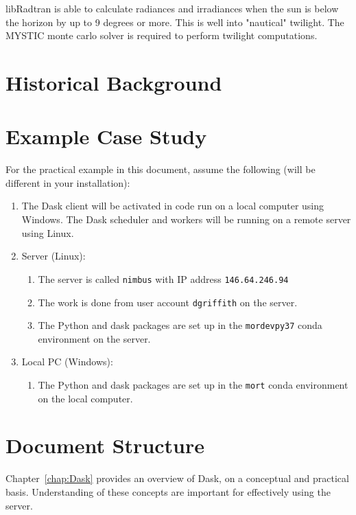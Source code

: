libRadtran is able to calculate radiances and irradiances when the sun is below the horizon by up
to 9 degrees or more. This is well into "nautical" twilight. The MYSTIC monte carlo solver is
required to perform twilight computations.


\section{Historical Background}


\section{Example Case Study}

For the practical example in this document, assume the following (will be different in your installation):
\begin{enumerate}
\item The Dask client will be activated in code run on a local computer using Windows.  The Dask scheduler and workers will be running on a remote server using Linux.
\item Server (Linux):
\begin{enumerate}
\item The server is called \lstinline{nimbus} with IP address \lstinline{146.64.246.94}
\item The work is done from  user account \lstinline{dgriffith} on the server.
\item The Python and dask packages are set up in the \lstinline{mordevpy37} conda environment  on the server.
\end{enumerate}

\item Local PC (Windows):
\begin{enumerate}
\item The Python and dask packages are set up in the \lstinline{mort} conda environment  on the local computer.
\end{enumerate}

\end{enumerate}


\section{Document Structure}
\label{sec:DocumentStructure}

Chapter~\ref{chap:Dask} provides an overview of Dask, on a conceptual and practical basis.  Understanding of these concepts are important for effectively using the server.

